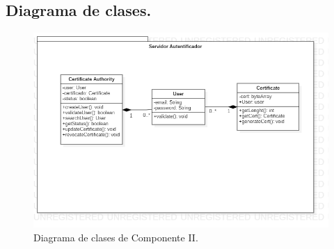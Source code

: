 \documentclass[12pt, a4paper, titlepage]{report}
\begin{document}
		
		\subsection{Diagrama de clases.}
		
		\begin{figure}[H]
        	\begin{center}	\includegraphics[width=13cm]{./imagenes/Disenio/Componente_2/C2_DC_P1.png}
        	\caption{Diagrama de clases de Componente II.}
        	\end{center}
		\end{figure}
			    
\end{document}
